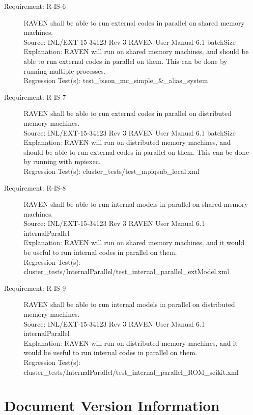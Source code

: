 \documentclass{article}
\newcommand{\requirement}[5]{\item[Requirement: #1] #2 \\Source: #3\\Explanation: #4\\Regression Test(s): #5}
\begin{document}
\begin{description}
\requirement{R-IS-6}{RAVEN shall be able to run external codes in parallel on shared memory machines.}
{INL/EXT-15-34123 Rev 3 RAVEN User Manual 6.1 batchSize}
{RAVEN will run on shared memory machines, and should be able to run external codes in parallel on them.  This can be done by running multiple processes.}
{test\_bison\_mc\_simple\_\&\_alias\_system}

\requirement{R-IS-7}{RAVEN shall be able to run external codes in parallel on distributed memory machines.}
{INL/EXT-15-34123 Rev 3 RAVEN User Manual 6.1 batchSize}
{RAVEN will run on distributed memory machines, and should be able to run external codes in parallel on them.  This can be done by running with mpiexec.}
{cluster\_tests/test\_mpiqsub\_local.xml}

\requirement{R-IS-8}{RAVEN shall be able to run internal models in parallel on shared memory machines.}
{INL/EXT-15-34123 Rev 3 RAVEN User Manual 6.1 internalParallel}
{RAVEN will run on shared memory machines, and it would be useful to run internal codes in parallel on them.}
{cluster\_tests/InternalParallel/test\_internal\_parallel\_extModel.xml}

\requirement{R-IS-9}{RAVEN shall be able to run internal models in parallel on distributed memory machines.}
{INL/EXT-15-34123 Rev 3 RAVEN User Manual 6.1 internalParallel}
{RAVEN will run on distributed memory machines, and it would be useful to run internal codes in parallel on them.}
{cluster\_tests/InternalParallel/test\_internal\_parallel\_ROM\_scikit.xml}

\end{description}

\section*{Document Version Information}


\end{document}
